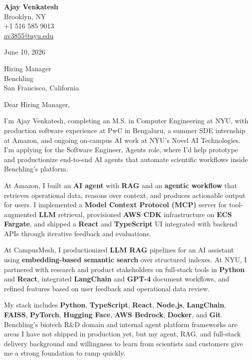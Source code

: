 \documentclass[letterpaper,11pt]{article}
\begin{document}
\begin{flushleft}
\textbf{\large Ajay Venkatesh} \\
Brooklyn, NY \\
+1 516 585 9013 \\
\href{mailto:av3855@nyu.edu}{av3855@nyu.edu}
\end{flushleft}
\vspace{10pt}
June 10, 2026
\vspace{6pt}

Hiring Manager \\
Benchling \\
San Francisco, California

\vspace{10pt}

Dear Hiring Manager,

I'm Ajay Venkatesh, completing an M.S. in Computer Engineering at NYU, with production software experience at PwC in Bengaluru, a summer SDE internship at Amazon, and ongoing on-campus AI work at NYU's Novel AI Technologies. I'm applying for the Software Engineer, Agents role, where I'd help prototype and productionize end-to-end AI agents that automate scientific workflows inside Benchling's platform.

At Amazon, I built an \textbf{AI agent} with \textbf{RAG} and an \textbf{agentic workflow} that retrieves operational data, reasons over context, and produces actionable output for users. I implemented a \textbf{Model Context Protocol (MCP)} server for tool-augmented \textbf{LLM} retrieval, provisioned \textbf{AWS CDK} infrastructure on \textbf{ECS Fargate}, and shipped a \textbf{React} and \textbf{TypeScript} UI integrated with backend APIs through iterative feedback and evaluations.

At CampusMesh, I productionized \textbf{LLM RAG} pipelines for an AI assistant using \textbf{embedding-based semantic search} over structured indexes. At NYU, I partnered with research and product stakeholders on full-stack tools in \textbf{Python} and \textbf{React}, integrated \textbf{LangChain} and \textbf{GPT-4} document workflows, and refined features based on user feedback and operational data review.

My stack includes \textbf{Python}, \textbf{TypeScript}, \textbf{React}, \textbf{Node.js}, \textbf{LangChain}, \textbf{FAISS}, \textbf{PyTorch}, \textbf{Hugging Face}, \textbf{AWS Bedrock}, \textbf{Docker}, and \textbf{Git}. Benchling's biotech R\&D domain and internal agent platform frameworks are areas I have not shipped in production yet, but my agent, RAG, and full-stack delivery background and willingness to learn from scientists and customers give me a strong foundation to ramp quickly.
\end{document}
